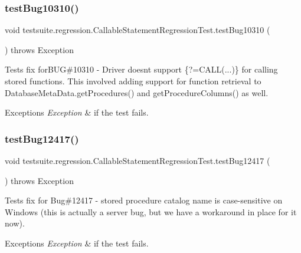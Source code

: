 \subsubsection{\texorpdfstring{test\+Bug10310()}{testBug10310()}}
{\footnotesize\ttfamily void testsuite.\+regression.\+Callable\+Statement\+Regression\+Test.\+test\+Bug10310 (\begin{DoxyParamCaption}{ }\end{DoxyParamCaption}) throws Exception}

Tests fix for\+B\+UG\#10310 -\/ Driver doesn\textquotesingle{}t support \{?=C\+A\+LL(...)\} for calling stored functions. This involved adding support for function retrieval to Database\+Meta\+Data.\+get\+Procedures() and get\+Procedure\+Columns() as well.


\begin{DoxyExceptions}{Exceptions}
{\em Exception} & if the test fails. \\
\hline
\end{DoxyExceptions}
\mbox{\label{classtestsuite_1_1regression_1_1_callable_statement_regression_test_a94871dee0acb2b3df8de40559b08d32d}} 
\subsubsection{\texorpdfstring{test\+Bug12417()}{testBug12417()}}
{\footnotesize\ttfamily void testsuite.\+regression.\+Callable\+Statement\+Regression\+Test.\+test\+Bug12417 (\begin{DoxyParamCaption}{ }\end{DoxyParamCaption}) throws Exception}

Tests fix for Bug\#12417 -\/ stored procedure catalog name is case-\/sensitive on Windows (this is actually a server bug, but we have a workaround in place for it now).


\begin{DoxyExceptions}{Exceptions}
{\em Exception} & if the test fails. \\
\hline
\end{DoxyExceptions}
\mbox{\label{classtestsuite_1_1regression_1_1_callable_statement_regression_test_a8378792de361d7a282b26a61c3b2f8a9}} 
